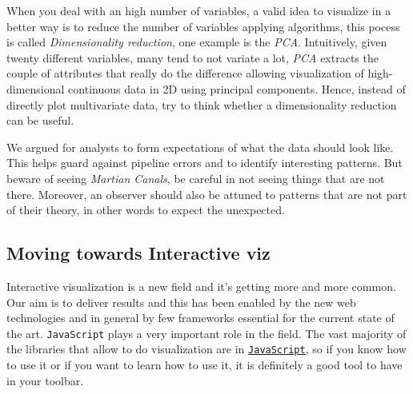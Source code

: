 
When you deal with an high number of variables, a valid idea to visualize in a better way is to reduce the number of variables applying algorithms, this pocess is called \emph{Dimensionality reduction}, one example is the \emph{PCA}. Intuitively, given twenty different variables, many tend to not variate a lot, \emph{PCA} extracts the couple of attributes that really do the difference allowing visualization of high-dimensional continuous data in 2D using principal components. Hence, instead of directly plot multivariate data, try to think whether a dimensionality reduction can be useful.

We argued for analysts to form expectations of what the data should look like. This helps guard against pipeline errors and to identify interesting patterns. But beware of seeing \emph{Martian Canals}, be careful in not seeing things that are not there. Moreover, an observer should also be attuned to patterns that are not part of their theory, in other words to expect the unexpected. 


\subsection{Moving towards Interactive viz}

Interactive visualization is a new field and it's getting more and more common. Our aim is to deliver results and this has been enabled by the new web technologies and in general by few frameworks essential for the current state of the art. \texttt{JavaScript} plays a very important role in the field. The vast majority of the libraries that allow to do visualization are in \href{https://www.codecademy.com/learn/javascript}{\texttt{JavaScript}}, so if you know how to use it or if you want to learn how to use it, it is definitely a good tool to have in your toolbar. 










